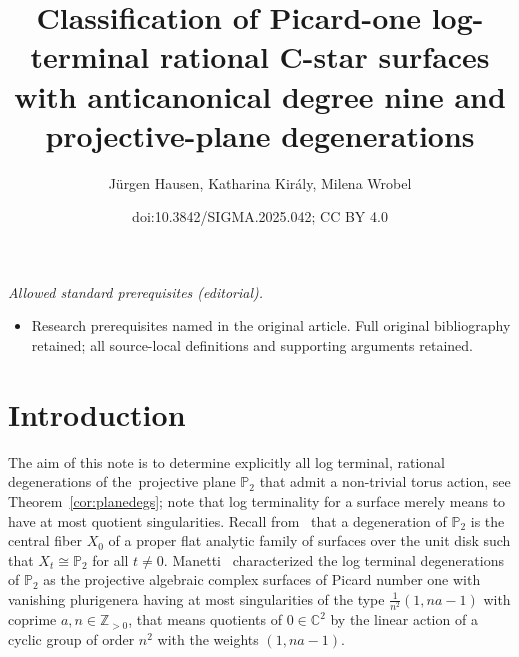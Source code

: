 \documentclass[10pt,a4paper]{amsart}
\title{Classification of Picard-one log-terminal rational C-star surfaces with anticanonical degree nine and projective-plane degenerations}
\author{Jürgen Hausen, Katharina Király, Milena Wrobel}
\date{doi:10.3842/SIGMA.2025.042; CC BY 4.0}
\theoremstyle{definition}
\def\CC{{\mathbb C}}
\def\ZZ{{\mathbb Z}}
\def\PP{{\mathbb P}}
\begin{document}
\maketitle
\noindent\textit{Allowed standard prerequisites (editorial).}\begin{itemize}
\item Research prerequisites named in the original article. Full original bibliography retained; all source-local definitions and supporting arguments retained.
\end{itemize}\medskip
\section{Introduction}

The aim of this note is to determine explicitly
all log terminal, rational degenerations of the~projective plane $\PP_2$
that admit a non-trivial torus action, see
Theorem~\ref{cor:planedegs}; note that log
terminality for a surface merely means to
have at most quotient singularities.
Recall from~\cite{Ma} that a degeneration of $\PP_2$ is the
central fiber $X_0$ of a proper flat analytic family of
surfaces over the unit disk such that $X_t \cong \PP_2$
for all $t \ne 0$.
Manetti~\cite{Ma} characterized the log terminal
degenerations of $\PP_2$
as the projective algebraic complex surfaces of
Picard number one with vanishing plurigenera having
at most singularities of the type $\frac{1}{n^2}(1,na-1)$
with coprime $a,n \in \ZZ_{>0}$, that means quotients
of $0 \in \CC^2$ by the linear action of a cyclic group
of order $n^2$ with the weights $(1,na-1)$.
\end{document}
